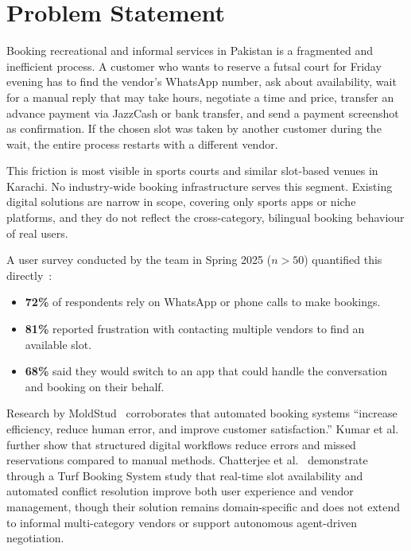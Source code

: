 \section{Problem Statement}
\label{sec:intro-problem}

Booking recreational and informal services in Pakistan is a fragmented and
inefficient process. A customer who wants to reserve a futsal court for Friday
evening has to find the vendor's WhatsApp number, ask about availability, wait
for a manual reply that may take hours, negotiate a time and price, transfer an
advance payment via JazzCash or bank transfer, and send a payment screenshot as
confirmation. If the chosen slot was taken by another customer during the wait,
the entire process restarts with a different vendor.

This friction is most visible in sports courts and similar slot-based venues in Karachi.
No industry-wide booking infrastructure serves this segment. Existing digital
solutions are narrow in scope, covering only sports apps or niche platforms, and they do not reflect the cross-category, bilingual booking
behaviour of real users.

A user survey conducted by the team in Spring 2025 ($n > 50$) quantified this
directly~\cite{survey2025}:
\begin{itemize}
  \item \textbf{72\%} of respondents rely on WhatsApp or phone calls to make bookings.
  \item \textbf{81\%} reported frustration with contacting multiple vendors to find
        an available slot.
  \item \textbf{68\%} said they would switch to an app that could handle the
        conversation and booking on their behalf.
\end{itemize}

Research by MoldStud~\cite{moldstud2024} corroborates that automated booking
systems ``increase efficiency, reduce human error, and improve customer
satisfaction.'' Kumar et al.~\cite{kumar2020} further show that structured
digital workflows reduce errors and missed reservations compared to manual
methods. Chatterjee et al.~\cite{chatterjee2025} demonstrate through a Turf
Booking System study that real-time slot availability and automated conflict
resolution improve both user experience and vendor management, though their
solution remains domain-specific and does not extend to informal multi-category
vendors or support autonomous agent-driven negotiation.

